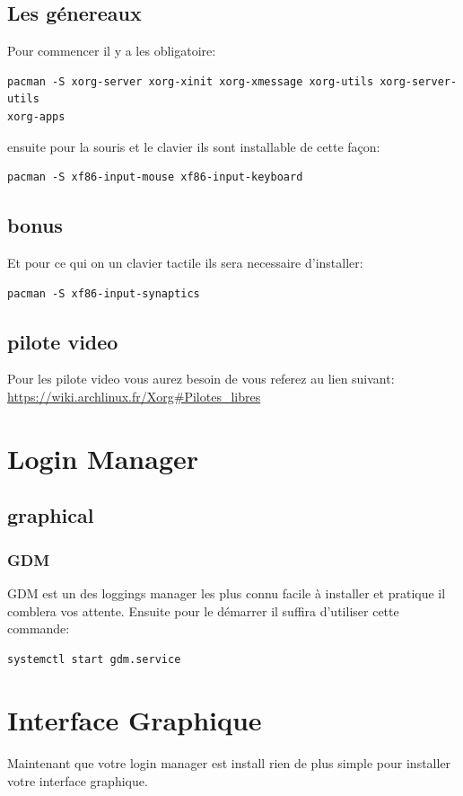 \documentclass[a4paper]{book}
\begin{document}
\section{Les g\'enereaux}
Pour commencer il y a les obligatoire\@:\\
\begin{lstlisting}
pacman -S xorg-server xorg-xinit xorg-xmessage xorg-utils xorg-server-utils
xorg-apps
\end{lstlisting}
ensuite pour la souris et le clavier ils sont installable de cette façon\@:\\
\begin{lstlisting}
pacman -S xf86-input-mouse xf86-input-keyboard
\end{lstlisting}
\section{bonus}
Et pour ce qui on un clavier tactile ils sera necessaire d'installer\@:\\
\begin{lstlisting}
pacman -S xf86-input-synaptics
\end{lstlisting}
\section{pilote video}
Pour les pilote video vous aurez besoin de vous referez au lien suivant\@:
\url{https://wiki.archlinux.fr/Xorg#Pilotes_libres}
\chapter{Login Manager}
\section{graphical}
\subsection{GDM}
GDM est un des loggings manager les plus connu facile à installer et pratique
il comblera vos attente.
Ensuite pour le démarrer il suffira d'utiliser cette commande\@:\\
\begin{lstlisting}
systemctl start gdm.service
\end{lstlisting}
\chapter{Interface Graphique}
Maintenant que votre login manager est install rien de plus simple pour
installer votre interface graphique.
\end{document}
